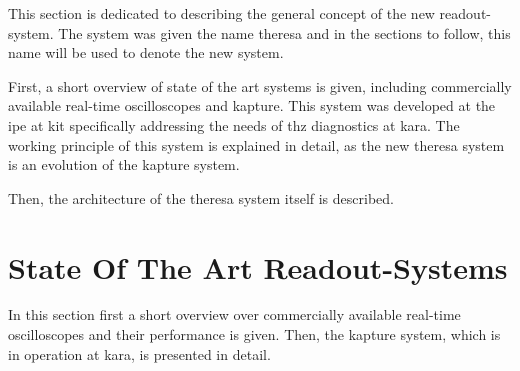 This section is dedicated to describing the general concept of the new readout-system. 
The system was given the name \gls{theresa} and in the sections to follow, this name will be used to denote the new system.

First, a short overview of state of the art systems is given, including commercially available real-time oscilloscopes and \gls{kapture}.
This system was developed at the \gls{ipe} at \gls{kit} specifically addressing the needs of \gls{thz} diagnostics at \gls{kara}.
The working principle of this system is explained in detail, as the new \gls{theresa} system is an evolution of the \gls{kapture} system. 

Then, the architecture of the \gls{theresa} system itself is described.

\section{State Of The Art Readout-Systems}
In this section first a short overview over commercially available real-time oscilloscopes and their performance is given. 
Then, the \gls{kapture} system, which is in operation at \gls{kara}, is presented in detail.
